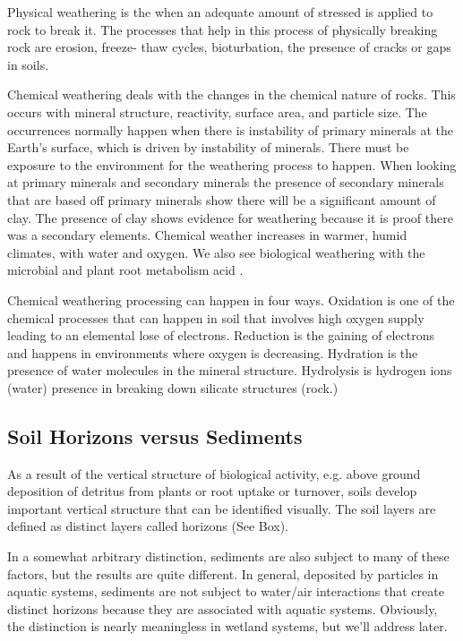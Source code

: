 Physical weathering is the when an adequate amount of stressed is applied to rock to break it. The processes that help in this process of physically breaking rock are erosion, freeze- thaw cycles, bioturbation, the presence of cracks or gaps in soils. 

Chemical weathering deals with the changes in the chemical nature of rocks. This occurs with mineral structure, reactivity, surface area, and particle size. The occurrences normally happen when there is instability of primary minerals at the Earth's surface, which is driven by instability of minerals. There must be exposure to the environment for the weathering process to happen. When looking at primary minerals and secondary minerals the presence of secondary minerals that are based off primary minerals show there will be a significant amount of clay. The presence of clay shows evidence for weathering because it is proof there was a secondary elements. Chemical weather increases in warmer, humid climates, with water and oxygen. We also see biological weathering with the microbial and plant root metabolism acid \citep{brady2007colloidal}. 

Chemical weathering processing can happen in four ways. Oxidation is one of the chemical processes that can happen in soil that involves high oxygen supply leading to an elemental lose of electrons. Reduction is the gaining of electrons and happens in environments where oxygen is decreasing. Hydration is the presence of water molecules in the mineral structure. Hydrolysis is hydrogen ions (water) presence in breaking down silicate structures (rock.)

\subsection{Soil Horizons versus Sediments}

As a result of the vertical structure of biological activity, e.g. above ground deposition of detritus from plants or root uptake or turnover, soils develop important vertical structure that can be identified visually. The soil layers are defined as distinct layers called horizons (See Box). %

In a somewhat arbitrary distinction, sediments are also subject to many of these factors, but the results are quite different. In general, deposited by particles in aquatic systems, sediments are not subject to water/air interactions that create distinct horizons because they are associated with aquatic systems. Obviously, the distinction is nearly meaningless in wetland systems, but we'll address later.

